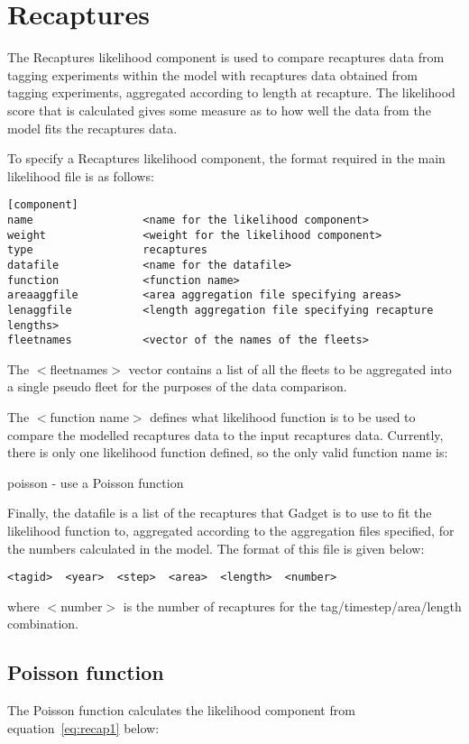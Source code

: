 \documentclass [a4paper, 10pt]{book}
\begin{document}
\section{Recaptures}\label{sec:recaptures}
The Recaptures likelihood component is used to compare recaptures data from tagging experiments within the model with recaptures data obtained from tagging experiments, aggregated according to length at recapture.  The likelihood score that is calculated gives some measure as to how well the data from the model fits the recaptures data.

\bigskip
To specify a Recaptures likelihood component, the format required in the main likelihood file is as follows:

{\small\begin{verbatim}
[component]
name                 <name for the likelihood component>
weight               <weight for the likelihood component>
type                 recaptures
datafile             <name for the datafile>
function             <function name>
areaaggfile          <area aggregation file specifying areas>
lenaggfile           <length aggregation file specifying recapture lengths>
fleetnames           <vector of the names of the fleets>
\end{verbatim}}

The $<$fleetnames$>$ vector contains a list of all the fleets to be aggregated into a single pseudo fleet for the purposes of the data comparison.

\bigskip
The $<$function name$>$ defines what likelihood function is to be used to compare the modelled recaptures data to the input recaptures data.  Currently, there is only one likelihood function defined, so the only valid function name is:

\bigskip
poisson - use a Poisson function

\bigskip
Finally, the datafile is a list of the recaptures that Gadget is to use to fit the likelihood function to, aggregated according to the aggregation files specified, for the numbers calculated in the model. The format of this file is given below:

{\small\begin{verbatim}
<tagid>  <year>  <step>  <area>  <length>  <number>
\end{verbatim}}

where $<$number$>$ is the number of recaptures for the tag/timestep/area/length combination.

\subsection{Poisson function}
The Poisson function calculates the likelihood component from equation~\ref{eq:recap1} below:
\end{document}
